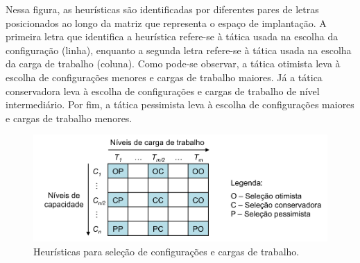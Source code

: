 \documentclass[12pt]{article}
\begin{document}

Nessa figura, as heurísticas são identificadas por diferentes pares de letras posicionados ao longo da matriz que representa o espaço de implantação. A primeira letra que identifica a heurística refere-se à tática usada na escolha da configuração (linha), enquanto a segunda letra refere-se à tática usada na escolha da carga de trabalho (coluna). Como pode-se observar, a tática otimista leva à escolha de configurações menores e cargas de trabalho maiores. Já a tática conservadora leva à escolha de configurações e cargas de trabalho de nível intermediário. Por fim, a tática pessimista leva à escolha de configurações maiores e cargas de trabalho menores.
 
 

\begin{figure}[t]
  \begin{center}
    \includegraphics[trim = 20mm 5mm 20mm 10mm, scale=.6]{img/heuristicas2}
  \end{center}
  \caption{\label{fig:heuristicas}Heurísticas para seleção de configurações e cargas de trabalho.}
\end{figure}
\end{document}
